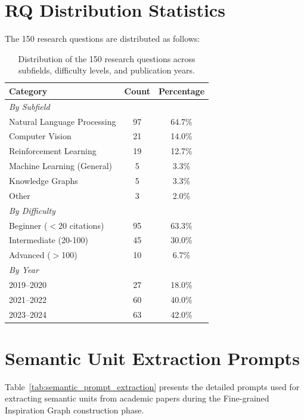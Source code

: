 \documentclass[runningheads]{llncs}
\begin{document}
\section{RQ Distribution Statistics}
\label{app:rq_distribution}

The 150 research questions are distributed as follows:

\begin{table}[h]
\centering
\small
\begin{tabular}{lcc}
\toprule
\textbf{Category} & \textbf{Count} & \textbf{Percentage} \\
\midrule
\multicolumn{3}{l}{\textit{By Subfield}} \\
Natural Language Processing & 97 & 64.7\% \\
Computer Vision & 21 & 14.0\% \\
Reinforcement Learning & 19 & 12.7\% \\
Machine Learning (General) & 5 & 3.3\% \\
Knowledge Graphs & 5 & 3.3\% \\
Other & 3 & 2.0\% \\
\midrule
\multicolumn{3}{l}{\textit{By Difficulty}} \\
Beginner ($<$20 citations) & 95 & 63.3\% \\
Intermediate (20-100) & 45 & 30.0\% \\
Advanced ($>$100) & 10 & 6.7\% \\
\midrule
\multicolumn{3}{l}{\textit{By Year}} \\
2019--2020 & 27 & 18.0\% \\
2021--2022 & 60 & 40.0\% \\
2023--2024 & 63 & 42.0\% \\
\bottomrule
\end{tabular}
\caption{Distribution of the 150 research questions across subfields, difficulty levels, and publication years.}
\label{tab:rq_distribution}
\end{table}



\section{Semantic Unit Extraction Prompts}
\label{app:semantic_prompts}

Table~\ref{tab:semantic_prompt_extraction} presents the detailed prompts used for extracting semantic units from academic papers during the Fine-grained Inspiration Graph construction phase.
\end{document}

